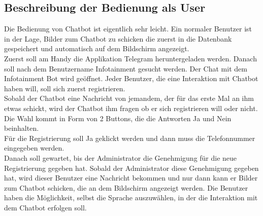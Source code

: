\subsection{Beschreibung der Bedienung als User}
Die Bedienung von Chatbot ist eigentlich sehr leicht. Ein normaler Benutzer ist in der Lage, Bilder zum Chatbot zu schicken die zuerst in die Datenbank gespeichert und automatisch auf dem Bildschirm angezeigt. \\
Zuerst soll am Handy die Applikation Telegram heruntergeladen werden. Danach soll nach dem Benutzername Infotainment gesucht werden. Der Chat mit dem Infotainment Bot wird geöffnet. 
Jeder Benutzer, die eine Interaktion mit Chatbot haben will, soll sich zuerst registrieren. \\
Sobald der Chatbot eine Nachricht von jemandem, der für das erste Mal an ihm etwas schickt, wird der Chatbot ihm fragen ob er sich registrieren will oder nicht. Die Wahl kommt in Form von 2 Buttons, die die Antworten Ja und Nein beinhalten.\\
Für die Registrierung soll Ja geklickt werden und dann muss die Telefonnummer eingegeben werden. \\
Danach soll gewartet, bis der Administrator die Genehmigung für die neue Registrierung gegeben hat. Sobald der Administrator diese Genehmigung gegeben hat, wird dieser Benutzer eine Nachricht bekommen und nur dann kann er Bilder zum Chatbot schicken, die an dem Bildschirm angezeigt werden. Die Benutzer haben die M\"oglichkeit, selbst die Sprache auszuw\"ahlen, in der die Interaktion mit dem Chatbot erfolgen soll.
